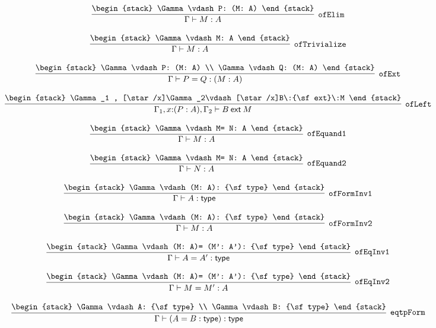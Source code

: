 \[
\infer[{\tt ofElim}]{\Gamma \vdash M: A}{
\begin{stack}
\Gamma \vdash P: (M: A)
\end{stack}}
\]

\[
\infer[{\tt ofTrivialize}]{\Gamma \vdash M: A}{
\begin{stack}
\Gamma \vdash M: A
\end{stack}}
\]

\[
\infer[{\tt ofExt}]{\Gamma \vdash P= Q: (M: A)}{
\begin{stack}
\Gamma \vdash P: (M: A)
\\
\Gamma \vdash Q: (M: A)
\end{stack}}
\]

\[
\infer[{\tt ofLeft}]{\Gamma_1 ,x\mathord{:}(P: A), \Gamma_2 \vdash B\:{\sf ext}\:M}{
\begin{stack}
\Gamma_1 , [\star /x]\Gamma_2\vdash [\star /x]B\:{\sf ext}\:M
\end{stack}}
\]

\[
\infer[{\tt ofEquand1}]{\Gamma \vdash M: A}{
\begin{stack}
\Gamma \vdash M= N: A
\end{stack}}
\]

\[
\infer[{\tt ofEquand2}]{\Gamma \vdash N: A}{
\begin{stack}
\Gamma \vdash M= N: A
\end{stack}}
\]

\[
\infer[{\tt ofFormInv1}]{\Gamma \vdash A: {\sf type}}{
\begin{stack}
\Gamma \vdash (M: A): {\sf type}
\end{stack}}
\]

\[
\infer[{\tt ofFormInv2}]{\Gamma \vdash M: A}{
\begin{stack}
\Gamma \vdash (M: A): {\sf type}
\end{stack}}
\]

\[
\infer[{\tt ofEqInv1}]{\Gamma \vdash A= A': {\sf type}}{
\begin{stack}
\Gamma \vdash (M: A)= (M': A'): {\sf type}
\end{stack}}
\]

\[
\infer[{\tt ofEqInv2}]{\Gamma \vdash M= M': A}{
\begin{stack}
\Gamma \vdash (M: A)= (M': A'): {\sf type}
\end{stack}}
\]

\[
\infer[{\tt eqtpForm}]{\Gamma \vdash (A= B: {\sf type}): {\sf type}}{
\begin{stack}
\Gamma \vdash A: {\sf type}
\\
\Gamma \vdash B: {\sf type}
\end{stack}}
\]

